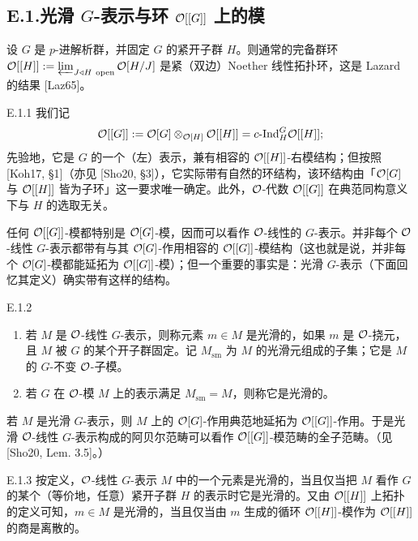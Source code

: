 \subsection*{E.1.\quad 光滑 $G$-表示与环 $\mathcal{O}[[G]]$ 上的模}

设 $G$ 是 $p$-进解析群，并固定 $G$ 的紧开子群 $H$。则通常的完备群环 $\OO[[H]]:=\varprojlim_{J\triangleleft H\ \text{open}}\OO[H/J]$ 是紧（双边）Noether 线性拓扑环，这是 Lazard 的结果 [Laz65]。


\begin{defn}{E.1.1}\label{thm:a4-20-3}
我们记
\[
\mathcal{O}[[G]]:=\mathcal{O}[G]\otimes_{\mathcal{O}[H]}\mathcal{O}[[H]]=c\text{-}\mathrm{Ind}_H^G\mathcal{O}[[H]];
\]
先验地，它是 $G$ 的一个（左）表示，兼有相容的 $\mathcal{O}[[H]]$-右模结构；但按照 [Koh17, §1]（亦见 [Sho20, §3]），它实际带有自然的环结构，该环结构由「$\mathcal{O}[G]$ 与 $\mathcal{O}[[H]]$ 皆为子环」这一要求唯一确定。此外，$\mathcal{O}$-代数 $\mathcal{O}[[G]]$ 在典范同构意义下与 $H$ 的选取无关。
\end{defn}

任何 $\mathcal{O}[[G]]$-模都特别是 $\mathcal{O}[G]$-模，因而可以看作 $\mathcal{O}$-线性的 $G$-表示。并非每个 $\mathcal{O}$-线性 $G$-表示都带有与其 $\mathcal{O}[G]$-作用相容的 $\mathcal{O}[[G]]$-模结构（这也就是说，并非每个 $\mathcal{O}[G]$-模都能延拓为 $\mathcal{O}[[G]]$-模）；但一个重要的事实是：光滑 $G$-表示（下面回忆其定义）确实带有这样的结构。

\begin{defn}{E.1.2}\label{thm:a4-20-4}
\begin{enumerate}[label=(\arabic*)]
\item 若 $M$ 是 $\mathcal{O}$-线性 $G$-表示，则称元素 $m\in M$ 是光滑的，如果 $m$ 是 $\mathcal{O}$-挠元，且 $M$ 被 $G$ 的某个开子群固定。记 $M_{\mathrm{sm}}$ 为 $M$ 的光滑元组成的子集；它是 $M$ 的 $G$-不变 $\mathcal{O}$-子模。
\item 若 $G$ 在 $\mathcal{O}$-模 $M$ 上的表示满足 $M_{\mathrm{sm}}=M$，则称它是光滑的。
\end{enumerate}
\end{defn}

若 $M$ 是光滑 $G$-表示，则 $M$ 上的 $\mathcal{O}[G]$-作用典范地延拓为 $\mathcal{O}[[G]]$-作用。于是光滑 $\mathcal{O}$-线性 $G$-表示构成的阿贝尔范畴可以看作 $\mathcal{O}[[G]]$-模范畴的全子范畴。（见 [Sho20, Lem. 3.5]。）

\begin{rem}{E.1.3}\label{thm:a4-20-5}
按定义，$\mathcal{O}$-线性 $G$-表示 $M$ 中的一个元素是光滑的，当且仅当把 $M$ 看作 $G$ 的某个（等价地，任意）紧开子群 $H$ 的表示时它是光滑的。又由 $\mathcal{O}[[H]]$ 上拓扑的定义可知，$m\in M$ 是光滑的，当且仅当由 $m$ 生成的循环 $\mathcal{O}[[H]]$-模作为 $\mathcal{O}[[H]]$ 的商是离散的。
\end{rem}

